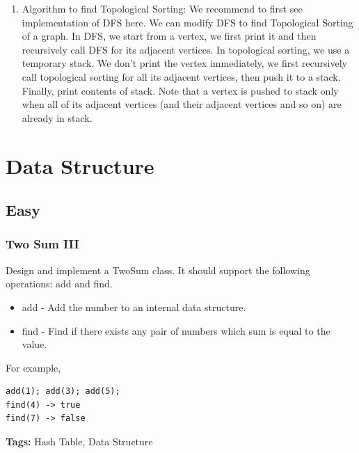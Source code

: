 \documentclass[11pt]{book}
\begin{document}
\begin{enumerate}
\item Algorithm to find Topological Sorting:
\label{sec-18-2-3-3}
We recommend to first see implementation of DFS here. We can modify DFS to find Topological Sorting of a graph. In DFS, we start from a vertex, we first print it and then recursively call DFS for its adjacent vertices. In topological sorting, we use a temporary stack. We don’t print the vertex immediately, we first recursively call topological sorting for all its adjacent vertices, then push it to a stack. Finally, print contents of stack. Note that a vertex is pushed to stack only when all of its adjacent vertices (and their adjacent vertices and so on) are already in stack.
\end{enumerate}

\chapter{Data Structure}
\label{sec-19}
\section{Easy}
\label{sec-19-1}
\subsection{Two Sum III}
\label{sec-19-1-1}
Design and implement a TwoSum class. It should support the following operations: add and find.
\begin{itemize}
\item add - Add the number to an internal data structure.
\item find - Find if there exists any pair of numbers which sum is equal to the value.
\end{itemize}
For example,
\lstset{language=java,label= ,caption= ,numbers=none}
\begin{lstlisting}
add(1); add(3); add(5);
find(4) -> true
find(7) -> false
\end{lstlisting}
\textbf{Tags:} Hash Table, Data Structure
\end{document}
